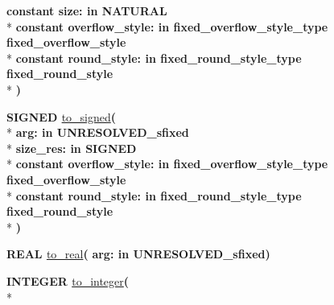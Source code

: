 \begin{DoxyCompactItemize}
{\bfseries {\bfseries \textcolor{keywordflow}{constant}\textcolor{vhdlchar}{ }}\textcolor{vhdlchar}{size\+: }\textcolor{stringliteral}{in }{\bfseries \textcolor{comment}{N\+A\+T\+U\+R\+A\+L}\textcolor{vhdlchar}{ }}}\\*
{\bfseries {\bfseries \textcolor{keywordflow}{constant}\textcolor{vhdlchar}{ }}\textcolor{vhdlchar}{overflow\+\_\+style\+: }\textcolor{stringliteral}{in }\textcolor{vhdlchar}{fixed\+\_\+overflow\+\_\+style\+\_\+type     fixed\+\_\+overflow\+\_\+style}}\\*
{\bfseries {\bfseries \textcolor{keywordflow}{constant}\textcolor{vhdlchar}{ }}\textcolor{vhdlchar}{round\+\_\+style\+: }\textcolor{stringliteral}{in }\textcolor{vhdlchar}{fixed\+\_\+round\+\_\+style\+\_\+type     fixed\+\_\+round\+\_\+style}}\\*
{\bfseries  )} 
\item 
{\bfseries {\bfseries \textcolor{comment}{S\+I\+G\+N\+E\+D}\textcolor{vhdlchar}{ }}} \hyperlink{classfixed__pkg_a10344b797d1b40385ab85edc4709b649}{to\+\_\+signed}{\bfseries  ( }\\*
{\bfseries \textcolor{vhdlchar}{arg\+: }\textcolor{stringliteral}{in }\textcolor{vhdlchar}{U\+N\+R\+E\+S\+O\+L\+V\+E\+D\+\_\+sfixed}}\\*
{\bfseries \textcolor{vhdlchar}{size\+\_\+res\+: }\textcolor{stringliteral}{in }{\bfseries \textcolor{comment}{S\+I\+G\+N\+E\+D}\textcolor{vhdlchar}{ }}}\\*
{\bfseries {\bfseries \textcolor{keywordflow}{constant}\textcolor{vhdlchar}{ }}\textcolor{vhdlchar}{overflow\+\_\+style\+: }\textcolor{stringliteral}{in }\textcolor{vhdlchar}{fixed\+\_\+overflow\+\_\+style\+\_\+type     fixed\+\_\+overflow\+\_\+style}}\\*
{\bfseries {\bfseries \textcolor{keywordflow}{constant}\textcolor{vhdlchar}{ }}\textcolor{vhdlchar}{round\+\_\+style\+: }\textcolor{stringliteral}{in }\textcolor{vhdlchar}{fixed\+\_\+round\+\_\+style\+\_\+type     fixed\+\_\+round\+\_\+style}}\\*
{\bfseries  )} 
\item 
{\bfseries {\bfseries \textcolor{comment}{R\+E\+A\+L}\textcolor{vhdlchar}{ }}} \hyperlink{classfixed__pkg_a5a07993e8b679308d776fe3fd1b67eb7}{to\+\_\+real}{\bfseries  ( }{\bfseries \textcolor{vhdlchar}{arg\+: }\textcolor{stringliteral}{in }\textcolor{vhdlchar}{U\+N\+R\+E\+S\+O\+L\+V\+E\+D\+\_\+sfixed}}{\bfseries  )} 
\item 
{\bfseries {\bfseries \textcolor{comment}{I\+N\+T\+E\+G\+E\+R}\textcolor{vhdlchar}{ }}} \hyperlink{classfixed__pkg_ac9431306d38abee05eb7d1bc4a5f19b2}{to\+\_\+integer}{\bfseries  ( }\\*

\end{DoxyCompactItemize}
